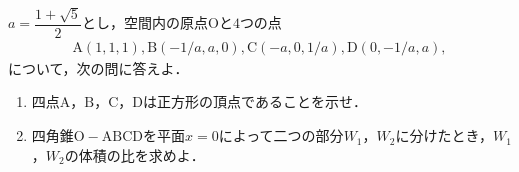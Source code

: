 \documentclass[../../main.tex]{subfiles}
\begin{document}
$ a=\dfrac{1+\sqrt{5}}{2}$とし，空間内の原点$\mathrm{O}$と$4$つの点
\begin{align*}
  \mathrm{A}(1,1,1), \mathrm{B}(-1/a,a,0),\mathrm{C}(-a,0,1/a),\mathrm{D}(0,-1/a,a),
\end{align*}
について，次の問に答えよ．
\begin{enumerate}
  \item 四点$\mathrm{A}$，$\mathrm{B}$，$\mathrm{C}$，$\mathrm{D}$は正方形の頂点であることを示せ．
  \item 四角錐$\mathrm{O-ABCD}$を平面$x=0$によって二つの部分$W_1$，$W_2$に分けたとき，$W_1$，$W_2$の体積の比を求めよ．
\end{enumerate}
\end{document}
